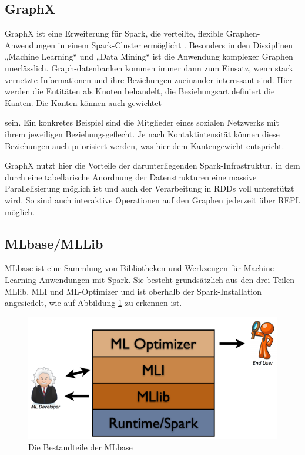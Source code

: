 \subsection{GraphX}
\label{section:graphX}


GraphX ist eine Erweiterung für Spark, die verteilte, flexible Graphen-Anwendungen in einem Spark-Cluster ermöglicht . Besonders in den Disziplinen „Machine Learning“ und „Data Mining“ ist die Anwendung komplexer Graphen unerlässlich. Graph-datenbanken kommen immer dann zum Einsatz, wenn stark vernetzte Informationen und ihre Beziehungen zueinander interessant sind. Hier werden die Entitäten als Knoten behandelt, die Beziehungsart definiert die Kanten. Die Kanten können auch gewichtet 

sein. Ein konkretes Beispiel sind die Mitglieder eines sozialen Netzwerks mit ihrem jeweiligen Beziehungsgeflecht. Je nach Kontaktintensität können diese Beziehungen auch priorisiert werden, was hier dem Kantengewicht entspricht.

GraphX nutzt hier die Vorteile der darunterliegenden Spark-Infrastruktur, in dem durch eine tabellarische Anordnung der Datenstrukturen eine massive Parallelisierung möglich ist und auch der Verarbeitung in RDDs voll unterstützt wird. So sind auch interaktive Operationen auf den Graphen jederzeit über REPL möglich. 

\subsection{MLbase/MLLib}
\label{section:mLbase/MLLib}


MLbase ist eine Sammlung von Bibliotheken und Werkzeugen für Machine-Learning-Anwendungen mit Spark. Sie besteht grundsätzlich aus den drei Teilen MLlib, MLI und ML-Optimizer und ist oberhalb der Spark-Installation angesiedelt, wie auf Abbildung \ref{fig:mlbase} zu erkennen ist. 

\begin{figure}[htb!]
\centering
\includegraphics[width=1.0\textwidth]{bilder/2_4_3_mlbase.png}
\caption{Die Bestandteile der MLbase \protect{}}
\label{fig:mlbase}
\end{figure} 
 


